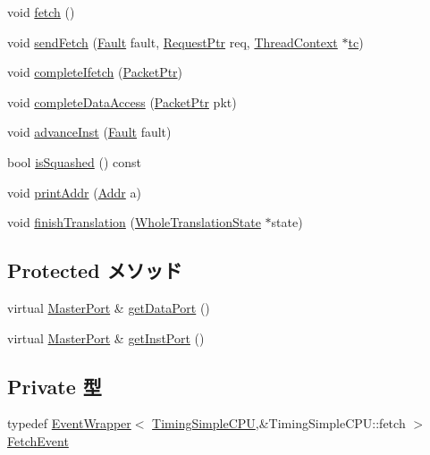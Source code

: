 \begin{DoxyCompactItemize}
\item 
void \hyperlink{classTimingSimpleCPU_a3865f8ea93e31d9b5d2726a80c0de966}{fetch} ()
\item 
void \hyperlink{classTimingSimpleCPU_a9c1e81509746ac06253e334c436e1a75}{sendFetch} (\hyperlink{classRefCountingPtr}{Fault} fault, \hyperlink{classRequest}{RequestPtr} req, \hyperlink{classThreadContext}{ThreadContext} $\ast$\hyperlink{classBaseSimpleCPU_a4455a4759e69e5ebe68ae7298cbcc37d}{tc})
\item 
void \hyperlink{classTimingSimpleCPU_a20b41c38922ef954c7e338f67bba971f}{completeIfetch} (\hyperlink{classPacket}{PacketPtr})
\item 
void \hyperlink{classTimingSimpleCPU_a0f7f0d3412bbf494cd3d0c0f48e5fcf2}{completeDataAccess} (\hyperlink{classPacket}{PacketPtr} pkt)
\item 
void \hyperlink{classTimingSimpleCPU_ab1a431d7af8dd2bbc95d09bd71be13ca}{advanceInst} (\hyperlink{classRefCountingPtr}{Fault} fault)
\item 
bool \hyperlink{classTimingSimpleCPU_add8df091bd836cf92c6987990d130b83}{isSquashed} () const 
\item 
void \hyperlink{classTimingSimpleCPU_a88aa41e2693dd0091afae2604eba9bed}{printAddr} (\hyperlink{base_2types_8hh_af1bb03d6a4ee096394a6749f0a169232}{Addr} a)
\item 
void \hyperlink{classTimingSimpleCPU_a36c2a28eca3086b67fc7168a37367e98}{finishTranslation} (\hyperlink{classWholeTranslationState}{WholeTranslationState} $\ast$state)
\end{DoxyCompactItemize}
\subsection*{Protected メソッド}
\begin{DoxyCompactItemize}
\item 
virtual \hyperlink{classMasterPort}{MasterPort} \& \hyperlink{classTimingSimpleCPU_aeea6b55ae1c4be53c21dbee434b221d4}{getDataPort} ()
\item 
virtual \hyperlink{classMasterPort}{MasterPort} \& \hyperlink{classTimingSimpleCPU_a40da530cb5dd380fd7fc0d786e94d5eb}{getInstPort} ()
\end{DoxyCompactItemize}
\subsection*{Private 型}
\begin{DoxyCompactItemize}
\item 
typedef \hyperlink{classEventWrapper}{EventWrapper}$<$ \hyperlink{classTimingSimpleCPU_1_1TimingSimpleCPU}{TimingSimpleCPU},\&TimingSimpleCPU::fetch $>$ \hyperlink{classTimingSimpleCPU_a270bc6f239eb2eb58adf45357010a894}{FetchEvent}
\end{DoxyCompactItemize}

